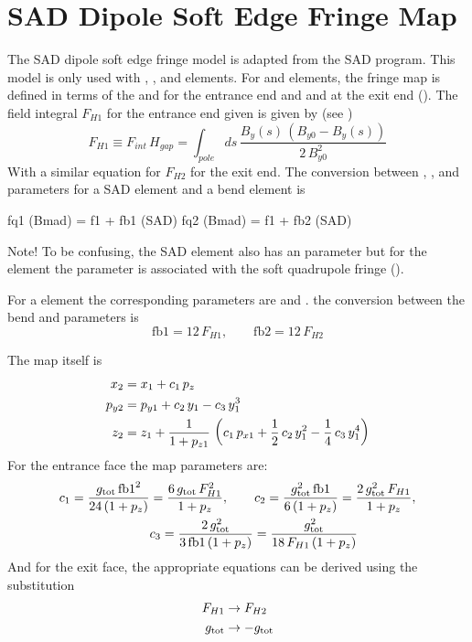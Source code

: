 {%
\section{SAD Dipole Soft Edge Fringe Map}
\label{s:fringe.bend.soft}

The SAD dipole soft edge fringe model is adapted from the SAD program\cite{b:sad}. This model is
only used with , , and  elements. For  and 
elements, the fringe map is defined in terms of the  and  for the entrance end and
 and  at the exit end (). The field integral $F_{H1}$ for the
entrance end given is given by (see )
\begin{equation}
  F_{H1} \equiv F_{int} \, H_{gap} = \int_{pole} \! \! ds \, \frac{B_y(s) \, (B_{y0} - B_y(s))}
  {2 \, B_{y0}^2}
\end{equation}
With a similar equation for $F_{H2}$ for the exit end. The conversion between , , and
 parameters for a SAD  element and a \bmad bend element is
\begin{example}
  fq1 (Bmad) = f1 + fb1 (SAD)
  fq2 (Bmad) = f1 + fb2 (SAD)
\end{example}
Note! To be confusing, the SAD  element also has an  parameter but for the 
element the  parameter is associated with the soft quadrupole fringe ().

For a  element the corresponding parameters are  and . the conversion between
the bend and  parameters is
\begin{equation}
  \text{fb1} = 12 \, F_{H1}, \qquad \text{fb2} = 12 \, F_{H2}
\end{equation}

The map itself is
\begin{align}
  x_2 &=  x_1 + c_1 \, p_z \nonumber \\
  p_{y2} &= p_{y1} + c_2 \, y_1 - c_3 \, y_1^3 \\
  z_2 &= z_1 + \frac{1}{1 + p_{z1}} \, \left( 
    c_1 \, p_{x1} + \frac{1}{2} \, c_2 \, y_1^2 -\frac{1}{4} \, c_3 \, y_1^4 \right)
    \nonumber
\end{align}
For the entrance face the map parameters are:
\begin{align}
  c_1 = \frac{g_{\text{tot}} \, \text{fb1}^2}{24 \, (1 + p_z)} &= \frac{6 \, g_{\text{tot}} \, F_{H1}^2}{1 + p_z}, \qquad 
  c_2 = \frac{g_{\text{tot}}^2 \, \text{fb1}}{6 \, (1 + p_z)} = \frac{2 \, g_{\text{tot}}^2 \, F_{H1}}{1 + p_z}, \nonumber \\
  &c_3 = \frac{2 \, g_{\text{tot}}^2}{3 \, \text{fb1} \, (1 + p_z)} = \frac{g_{\text{tot}}^2}{18 \, F_{H1} \, (1 + p_z)}
\end{align}
And for the exit face, the appropriate equations can be derived using the substitution
\begin{align}
  F_{H1} &\rightarrow F_{H2} \nonumber \\
  g_{\text{tot}} &\rightarrow -g_{\text{tot}}
\end{align}

}
